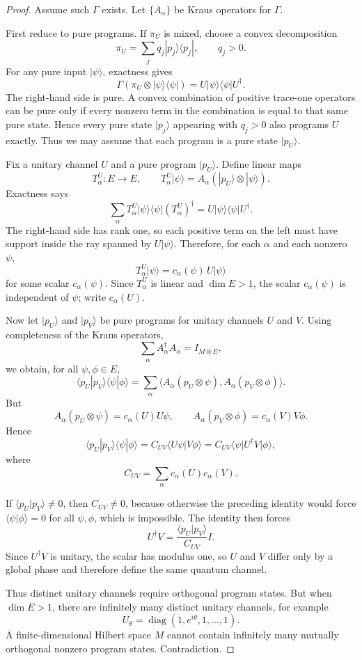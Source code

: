 \documentclass[11pt]{article}
\DeclareMathOperator{\diag}{diag}
\begin{document}
\begin{proof}
Assume such $\Gamma$ exists. Let $\{A_\alpha\}$ be Kraus operators for
$\Gamma$.

First reduce to pure programs. If $\pi_U$ is mixed, choose a convex
decomposition
\[
\pi_U=\sum_j q_j |p_j\rangle\langle p_j|,
\qquad q_j>0.
\]
For any pure input $|\psi\rangle$, exactness gives
\[
\Gamma(\pi_U\otimes |\psi\rangle\langle\psi|)
=
U|\psi\rangle\langle\psi|U^\dagger.
\]
The right-hand side is pure. A convex combination of positive trace-one
operators can be pure only if every nonzero term in the combination is equal
to that same pure state. Hence every pure state $|p_j\rangle$ appearing with
$q_j>0$ also programs $U$ exactly. Thus we may assume that each program is a
pure state $|p_U\rangle$.

Fix a unitary channel $U$ and a pure program $|p_U\rangle$. Define linear
maps
\[
T_\alpha^U:E\longrightarrow E,
\qquad
T_\alpha^U|\psi\rangle
=
A_\alpha(|p_U\rangle\otimes|\psi\rangle).
\]
Exactness says
\[
\sum_\alpha T_\alpha^U|\psi\rangle\langle\psi|(T_\alpha^U)^\dagger
=
U|\psi\rangle\langle\psi|U^\dagger.
\]
The right-hand side has rank one, so each positive term on the left must have
support inside the ray spanned by $U|\psi\rangle$. Therefore, for each
$\alpha$ and each nonzero $\psi$,
\[
T_\alpha^U|\psi\rangle
=
c_\alpha(\psi)\,U|\psi\rangle
\]
for some scalar $c_\alpha(\psi)$. Since $T_\alpha^U$ is linear and
$\dim E>1$, the scalar $c_\alpha(\psi)$ is independent of $\psi$; write
$c_\alpha(U)$.

Now let $|p_U\rangle$ and $|p_V\rangle$ be pure programs for unitary
channels $U$ and $V$. Using completeness of the Kraus operators,
\[
\sum_\alpha A_\alpha^\dagger A_\alpha=I_{M\otimes E},
\]
we obtain, for all $\psi,\phi\in E$,
\[
\langle p_U|p_V\rangle\langle\psi|\phi\rangle
=
\sum_\alpha
\langle A_\alpha(p_U\otimes\psi),A_\alpha(p_V\otimes\phi)\rangle.
\]
But
\[
A_\alpha(p_U\otimes\psi)=c_\alpha(U)U\psi,
\qquad
A_\alpha(p_V\otimes\phi)=c_\alpha(V)V\phi.
\]
Hence
\[
\langle p_U|p_V\rangle\langle\psi|\phi\rangle
=
C_{UV}\langle U\psi|V\phi\rangle
=
C_{UV}\langle\psi|U^\dagger V|\phi\rangle,
\]
where
\[
C_{UV}=\sum_\alpha \overline{c_\alpha(U)}c_\alpha(V).
\]

If $\langle p_U|p_V\rangle\neq0$, then $C_{UV}\neq0$, because otherwise the
preceding identity would force
$\langle\psi|\phi\rangle=0$ for all $\psi,\phi$, which is impossible. The
identity then forces
\[
U^\dagger V
=
\frac{\langle p_U|p_V\rangle}{C_{UV}}I.
\]
Since $U^\dagger V$ is unitary, the scalar has modulus one, so $U$ and $V$
differ only by a global phase and therefore define the same quantum channel.

Thus distinct unitary channels require orthogonal program states. But when
$\dim E>1$, there are infinitely many distinct unitary channels, for example
\[
U_\theta=\diag(1,e^{i\theta},1,\dots,1).
\]
A finite-dimensional Hilbert space $M$ cannot contain infinitely many mutually
orthogonal nonzero program states. Contradiction.
\end{proof}
\end{document}
